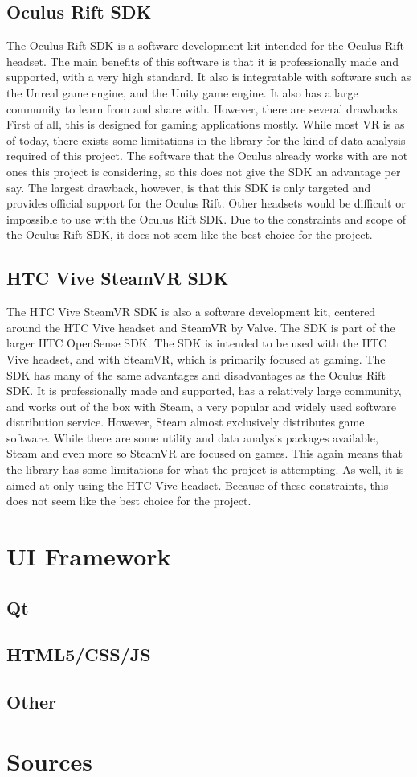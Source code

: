 \documentclass{article}
\begin{document}
\subsection{Oculus Rift SDK} 

The Oculus Rift SDK is a software development kit intended for the Oculus Rift headset.
The main benefits of this software is that it is professionally made and supported, with
a very high standard. It also is integratable with software such as the Unreal game engine,
and the Unity game engine. It also has a large community to learn from and share with. However,
there are several drawbacks. First of all, this is designed for gaming applications mostly. While most
VR is as of today, there exists some limitations in the library for the kind of data analysis required of
this project. The software that the Oculus already works with are not ones this project is considering,
so this does not give the SDK an advantage per say. The largest drawback, however, 
is that this SDK is only targeted and provides official support for the Oculus Rift. 
Other headsets would be difficult or impossible to use with the Oculus Rift SDK.
Due to the constraints and scope of the Oculus Rift SDK, it does not seem like the best choice for the
project. 

\subsection{HTC Vive SteamVR SDK}

The HTC Vive SteamVR SDK is also a software development kit, centered around the HTC Vive headset
and SteamVR by Valve. The SDK is part of the larger HTC OpenSense SDK. The SDK is intended to be used
with the HTC Vive headset, and with SteamVR, which is primarily focused at gaming. The SDK has many
of the same advantages and disadvantages as the Oculus Rift SDK. It is professionally made and supported,
has a relatively large community, and works out of the box with Steam, a very popular and widely used
software distribution service. However, Steam almost exclusively distributes game software. While there
are some utility and data analysis packages available, Steam and even more so SteamVR are focused on
games. This again means that the library has some limitations for what the project is attempting. As well,
it is aimed at only using the HTC Vive headset. Because of these constraints, this does not seem like the
best choice for the project.

\section{UI Framework}
\subsection{Qt}
\subsection{HTML5/CSS/JS}
\subsection{Other}

\section{Sources}
\end{document}
